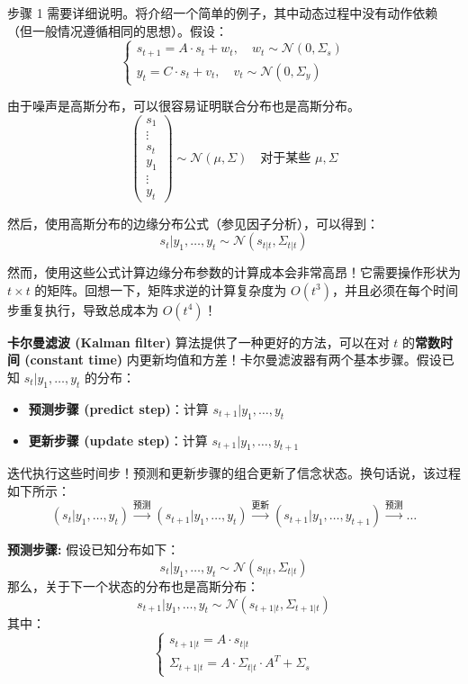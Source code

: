 步骤 1 需要详细说明。将介绍一个简单的例子，其中动态过程中没有动作依赖（但一般情况遵循相同的思想）。假设：
\[
    \begin{cases}
        s_{t+1} = A \cdot s_t + w_t, \quad w_t \sim \mathcal{N}(0, \Sigma_s) \\
        y_t = C \cdot s_t + v_t, \quad v_t \sim \mathcal{N}(0, \Sigma_y)
    \end{cases}
\]

由于噪声是高斯分布，可以很容易证明联合分布也是高斯分布。
\[
    \begin{pmatrix}
        s_1 \\
        \vdots \\
        s_t \\
        y_1 \\
        \vdots \\
        y_t
    \end{pmatrix}
    \sim \mathcal{N}(\mu, \Sigma) \quad \text{对于某些 } \mu, \Sigma
\]

然后，使用高斯分布的边缘分布公式（参见因子分析），可以得到：
\[
    s_t|y_1, \dots, y_t \sim \mathcal{N}(s_{t|t}, \Sigma_{t|t})
\]

然而，使用这些公式计算边缘分布参数的计算成本会非常高昂！它需要操作形状为 $t \times t$ 的矩阵。回想一下，矩阵求逆的计算复杂度为 $O(t^3)$，并且必须在每个时间步重复执行，导致总成本为 $O(t^4)$！

\textbf{卡尔曼滤波 (Kalman filter)} 算法提供了一种更好的方法，可以在对 $t$ 的\textbf{常数时间 (constant time)} 内更新均值和方差！卡尔曼滤波器有两个基本步骤。假设已知 $s_t|y_1, \dots, y_t$ 的分布：
\begin{itemize}
    \item[] \textbf{预测步骤 (predict step)}：计算 $s_{t+1}|y_1, \dots, y_t$
    \item[] \textbf{更新步骤 (update step)}：计算 $s_{t+1}|y_1, \dots, y_{t+1}$
\end{itemize}
迭代执行这些时间步！预测和更新步骤的组合更新了信念状态。换句话说，该过程如下所示：
\[
    (s_t|y_1, \dots, y_t) \xrightarrow{\text{预测}} (s_{t+1}|y_1, \dots, y_t) \xrightarrow{\text{更新}} (s_{t+1}|y_1, \dots, y_{t+1}) \xrightarrow{\text{预测}} \dots
\]

\noindent\textbf{预测步骤:} 假设已知分布如下：
\[
    s_t|y_1, \dots, y_t \sim \mathcal{N}(s_{t|t}, \Sigma_{t|t})
\]
那么，关于下一个状态的分布也是高斯分布：
\[
    s_{t+1}|y_1, \dots, y_t \sim \mathcal{N}(s_{t+1|t}, \Sigma_{t+1|t})
\]
其中：
\[
    \begin{cases}
        s_{t+1|t} = A \cdot s_{t|t} \\
        \Sigma_{t+1|t} = A \cdot \Sigma_{t|t} \cdot A^T + \Sigma_s
    \end{cases}
\]


